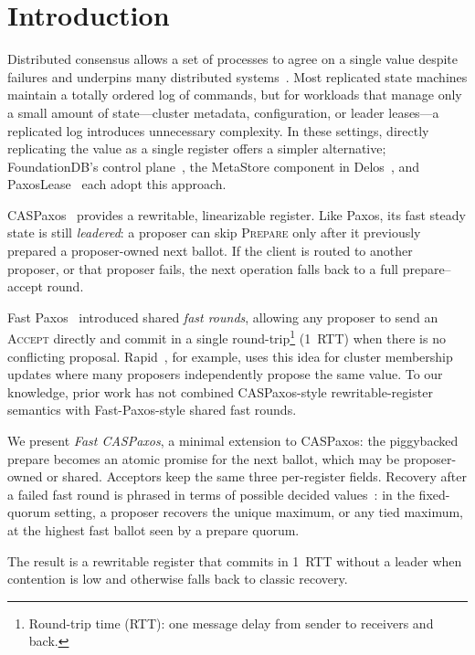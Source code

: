 \section{Introduction}
\label{sec:introduction}

Distributed consensus allows a set of processes to agree on a single value despite failures and underpins many distributed systems~\cite{schneider_cs90,chandra_podc07}.
Most replicated state machines maintain a totally ordered log of commands, but for workloads that manage only a small amount of state---cluster metadata, configuration, or leader leases---a replicated log introduces unnecessary complexity.
In these settings, directly replicating the value as a single register offers a simpler alternative; FoundationDB's control plane~\cite{zhou_sigmod21,chockler_podc02}, the MetaStore component in Delos~\cite{balakrishnan_osdi20}, and PaxosLease~\cite{trencseni_paxoslease} each adopt this approach.

CASPaxos~\cite{rystsov_caspaxos} provides a rewritable, linearizable register.
Like Paxos, its fast steady state is still \emph{leadered}: a proposer can skip \textsc{Prepare} only after it previously prepared a proposer-owned next ballot.
If the client is routed to another proposer, or that proposer fails, the next operation falls back to a full prepare--accept round.

Fast Paxos~\cite{lamport_msr05} introduced shared \emph{fast rounds}, allowing any proposer to send an \textsc{Accept} directly and commit in a single round-trip\footnote{Round-trip time (RTT): one message delay from sender to receivers and back.} (1~RTT) when there is no conflicting proposal.
Rapid~\cite{suresh_atc18}, for example, uses this idea for cluster membership updates where many proposers independently propose the same value.
To our knowledge, prior work has not combined CASPaxos-style rewritable-register semantics with Fast-Paxos-style shared fast rounds.

We present \emph{Fast CASPaxos}, a minimal extension to CASPaxos: the piggybacked prepare becomes an atomic promise for the next ballot, which may be proposer-owned or shared.
Acceptors keep the same three per-register fields.
Recovery after a failed fast round is phrased in terms of possible decided values~\cite{howard_tr19}: in the fixed-quorum setting, a proposer recovers the unique maximum, or any tied maximum, at the highest fast ballot seen by a prepare quorum.

The result is a rewritable register that commits in 1~RTT without a leader when contention is low and otherwise falls back to classic recovery.
